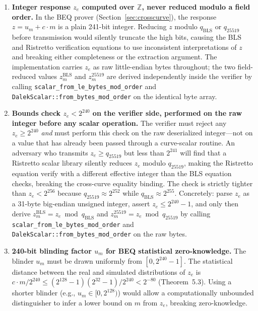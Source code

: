 \documentclass[11pt]{article}
\theoremstyle{definitionstyle}
\theoremstyle{plain}
\begin{document}
\begin{enumerate}[leftmargin=*,label=\textbf{C\arabic*.}]

\item \textbf{Integer response $z_e$ computed over $\mathbb{Z}$, never reduced
  modulo a field order.}
  In the BEQ prover (Section~\ref{sec:crosscurve}), the response $z = u_m +
  c \cdot m$ is a plain 241-bit integer.  Reducing $z$ modulo $q_{\text{BLS}}$
  or $q_{25519}$ before transmission would silently truncate the high bits,
  causing the BLS and Ristretto verification equations to use inconsistent
  interpretations of $z$ and breaking either completeness or the extraction
  argument.  The implementation carries $z_e$ as raw little-endian bytes
  throughout; the two field-reduced values $z_m^{\text{BLS}}$ and
  $z_m^{25519}$ are derived independently inside the verifier by calling
  \texttt{scalar\_from\_le\_bytes\_mod\_order} and
  \texttt{DalekScalar::from\_bytes\_mod\_order} on the identical byte array.

\item \textbf{Bounds check $z_e < 2^{240}$ on the verifier side, performed on the raw integer before any scalar operation.}
  The verifier must reject any $z_e \ge 2^{240}$ \emph{and} must perform this check on the raw deserialized integer---not on a value that has already been passed through a curve-scalar routine.  An
  adversary who transmits $z_e \ge q_{25519}$ but less than $2^{241}$ will find that a Ristretto scalar library silently reduces $z_e$ modulo $q_{25519}$, making the Ristretto equation verify with a different
  effective integer than the BLS equation checks, breaking the
  cross-curve equality binding.  The check is strictly tighter than
  $z_e < 2^{256}$ because $q_{25519} \approx 2^{252}$ while $q_{\text{BLS}}
  \approx 2^{255}$.  Concretely: parse $z_e$ as a 31-byte big-endian unsigned integer, assert $z_e \le 2^{240}-1$, and only then derive $z_m^{\text{BLS}} = z_e \bmod q_{\text{BLS}}$ and $z_m^{25519} = z_e \bmod q_{25519}$ by calling \texttt{scalar\_from\_le\_bytes\_mod\_order} and \texttt{DalekScalar::from\_bytes\_mod\_order} on the raw bytes.

\item \textbf{240-bit blinding factor $u_m$ for BEQ statistical zero-knowledge.}
  The blinder $u_m$ must be drawn uniformly from $[0, 2^{240}-1]$.  The
  statistical distance between the real and simulated distributions of $z_e$
  is $c \cdot m / 2^{240} \le (2^{128}-1)(2^{32}-1)/2^{240} < 2^{-80}$
  (Theorem~5.3).  Using a shorter blinder (e.g., $u_m \in [0, 2^{128})$) would
  allow a computationally unbounded distinguisher to infer a lower bound on
  $m$ from $z_e$, breaking zero-knowledge.


\end{enumerate}
\end{document}
